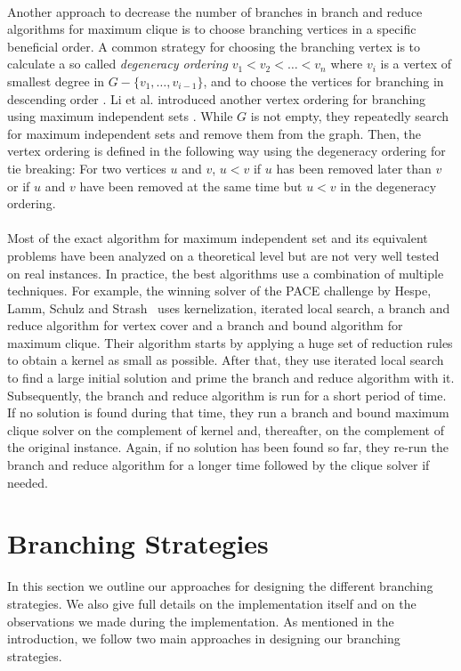 \documentclass[]{article}
\begin{document}
\paragraph{}
Another approach to decrease the number of branches in branch and reduce algorithms for maximum clique is to choose branching vertices in a specific beneficial order. A common strategy for choosing the branching vertex is to calculate a so called \textit{degeneracy ordering} $v_1 < v_2 < \dots < v_n$ where $v_i$ is a vertex of smallest degree in $G - \{v_1, \dots, v_{i-1} \}$, and to choose the vertices for branching in descending order \cite{CarraghanPardalos}. Li et al. introduced another vertex ordering for branching using maximum independent sets \cite{LiFangXu}. While $G$ is not empty, they repeatedly search for maximum independent sets and remove them from the graph. Then, the vertex ordering is defined in the following way using the degeneracy ordering for tie breaking: For two vertices $u$ and $v$, $u < v$ if $u$ has been removed later than $v$ or if $u$ and $v$ have been removed at the same time but $u < v$ in the degeneracy ordering. 
 
\paragraph{}
Most of the exact algorithm for maximum independent set and its equivalent problems have been analyzed on a theoretical level but are not very well tested on real instances. In practice, the best algorithms use a combination of multiple techniques. For example, the winning solver of the PACE challenge by Hespe, Lamm, Schulz and Strash~\cite{bibid} uses kernelization, iterated local search, a branch and reduce algorithm for vertex cover and a branch and bound algorithm for maximum clique. Their algorithm starts by applying a huge set of reduction rules to obtain a kernel as small as possible. After that, they use iterated local search to find a large initial solution and prime the branch and reduce algorithm with it. Subsequently, the branch and reduce algorithm is run for a short period of time. If no solution is found during that time, they run a branch and bound maximum clique solver on the complement of kernel and, thereafter, on the complement of the original instance. Again, if no solution has been found so far, they re-run the branch and reduce algorithm for a longer time followed by the clique solver if needed.

\newpage
\section{Branching Strategies} \label{sec4}
In this section we outline our approaches for designing the different branching strategies. We also give full details on the implementation itself and on the observations we made during the implementation. As mentioned in the introduction, we follow two main approaches in designing our branching strategies. 
\end{document}
